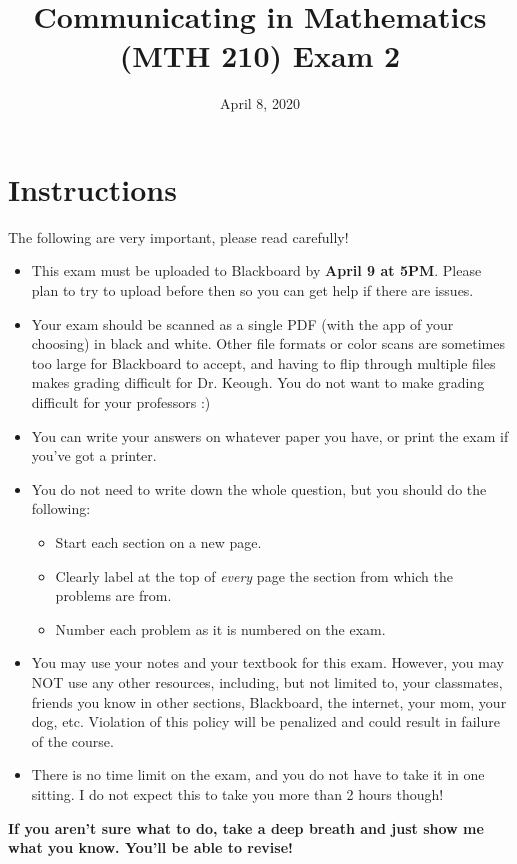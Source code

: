 \documentclass[11pt,answers]{exam}
\title{Communicating in Mathematics (MTH 210) Exam 2}
\date{April 8, 2020}
\begin{document}
\maketitle

\section*{Instructions}  



\noindent The following are very important, please read carefully!
\begin{itemize}
\item This exam must be uploaded to Blackboard by \textbf{April 9 at 5PM}. Please plan to try to upload before then so you can get help if there are issues.
\item Your exam should be scanned as a single PDF (with the app of your choosing) in black and white. Other file formats or color scans are sometimes too large for Blackboard to accept, and having to flip through multiple files makes grading difficult for Dr. Keough. You do not want to make grading difficult for your professors :)
\item You can write your answers on whatever paper you have, or print the exam if you've got a printer. 
\item You do not need to write down the whole question, but you should do the following:
	\begin{itemize}
	\item Start each section on a new page.
	\item Clearly label at the top of \emph{every} page the section from which the problems are from.
	\item Number each problem as it is numbered on the exam.
	\end{itemize}
\item You may use your notes and your textbook for this exam. However, you may NOT use any other resources, including, but not limited to, your classmates, friends you know in other sections, Blackboard, the internet, your mom, your dog, etc. Violation of this policy will be penalized and could result in failure of the course.
\item There is no time limit on the exam, and you do not have to take it in one sitting. I do not expect this to take you more than 2 hours though!
\end{itemize} 

\begin{center}
\textbf{If you aren't sure what to do, take a deep breath and just show me what you know. You'll be able to revise!}
\end{center}
\end{document}
